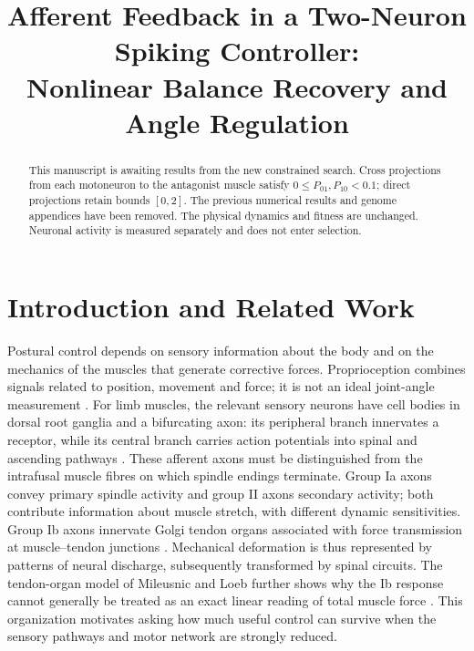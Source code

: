 \documentclass{styles/svproc}
\begin{document}
\mainmatter
\title{Afferent Feedback in a Two-Neuron Spiking Controller:\\Nonlinear Balance Recovery and Angle Regulation}

\maketitle
\begin{abstract}
This manuscript is awaiting results from the new constrained search. Cross projections from each motoneuron to the antagonist muscle satisfy $0\le P_{01},P_{10}<0.1$; direct projections retain bounds $[0,2]$. The previous numerical results and genome appendices have been removed. The physical dynamics and fitness are unchanged. Neuronal activity is measured separately and does not enter selection.
\end{abstract}

\section{Introduction and Related Work}
Postural control depends on sensory information about the body and on the mechanics of the muscles that generate corrective forces. Proprioception combines signals related to position, movement and force; it is not an ideal joint-angle measurement \cite{proske2012}. For limb muscles, the relevant sensory neurons have cell bodies in dorsal root ganglia and a bifurcating axon: its peripheral branch innervates a receptor, while its central branch carries action potentials into spinal and ascending pathways \cite{marasco2023}. These afferent axons must be distinguished from the intrafusal muscle fibres on which spindle endings terminate. Group Ia axons convey primary spindle activity and group II axons secondary activity; both contribute information about muscle stretch, with different dynamic sensitivities. Group Ib axons innervate Golgi tendon organs associated with force transmission at muscle--tendon junctions \cite{proske2012,marasco2023}. Mechanical deformation is thus represented by patterns of neural discharge, subsequently transformed by spinal circuits. The tendon-organ model of Mileusnic and Loeb further shows why the Ib response cannot generally be treated as an exact linear reading of total muscle force \cite{mileusnic2006gto}. This organization motivates asking how much useful control can survive when the sensory pathways and motor network are strongly reduced.
\end{document}
